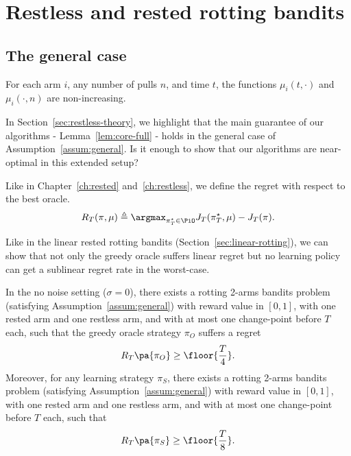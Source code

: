 \section{Restless and rested rotting bandits}
\label{sec:general_decreasing_MAB_framework}
\subsection{The general case}
\begin{assumption}\label{assum:general}
For each arm $i$, any number of pulls $n$, and time $t$, the functions $\mu_i(t,\cdot)$ and $\mu_i(\cdot,n)$ are non-increasing.
\end{assumption}

In Section~\ref{sec:restless-theory}, we highlight that the main guarantee of our algorithms - Lemma~\ref{lem:core-full} -  holds in the general case of Assumption~\ref{assum:general}. Is it enough to show that our algorithms are near-optimal in this extended setup?

Like in Chapter~\ref{ch:rested} and~\ref{ch:restless}, we define the regret with respect to the best oracle.
\begin{equation*}
R_T(\pi, \mu) \triangleq \argmax_{\pi^\star_T \in \PiO}  J_T(\pi^\star_T, \mu) - J_T(\pi).
\end{equation*}

Like in the linear rested rotting bandits (Section~\ref{sec:linear-rotting}), we can show that not only the greedy oracle suffers linear regret but no learning policy can get a sublinear regret rate in the worst-case. 

\begin{proposition}
\label{prop:general-rotting-unlearnable}
In the no noise setting ($\sigma = 0$), there exists a rotting 2-arms bandits problem (satisfying Assumption~\ref{assum:general}) with reward value in $\left[0,1\right]$, with one rested arm and one restless arm, and with at most one change-point before $T$ each, such that the greedy oracle strategy $\pi_O$ suffers a regret 
\[R_T\pa{\pi_O} \geq \floor{\frac{T}{4}}.\]
Moreover, for any learning strategy  $\pi_S$, there exists a rotting 2-arms bandits problem (satisfying Assumption~\ref{assum:general}) with reward value in $\left[0,1\right]$, with one rested arm and one restless arm, and with at most one change-point before $T$ each, such that 
\[R_T\pa{\pi_S} \geq \floor{\frac{T}{8}}.\]
\end{proposition}

